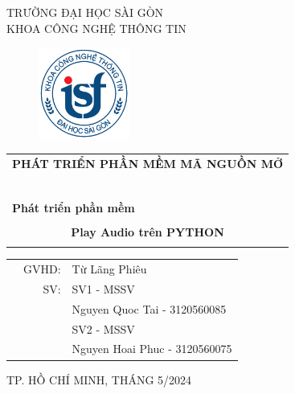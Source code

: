 \documentclass[a4paper]{article}
\begin{document}
\begin{titlepage}
\begin{center}
TRƯỜNG ĐẠI HỌC SÀI GÒN \\
KHOA CÔNG NGHỆ THÔNG TIN
\end{center}
\vspace{1cm}

\begin{figure}[h!]
\begin{center}
\includegraphics[width=3cm]{logoITSGU.png}
\end{center}
\end{figure}

\vspace{1cm}

\begin{center}
\begin{tabular}{c}
    \multicolumn{1}{l}{\textbf{{\Large PHÁT TRIỂN PHẦN MỀM MÃ NGUỒN MỞ}}}\\
    ~~\\
    \hline
    \\
    \multicolumn{1}{l}{\textbf{{\Large Phát triển phần mềm }}}\\
    \\
    \textbf{{\Huge Play Audio trên PYTHON}}\\
    \\
    \hline
\end{tabular}
\end{center}

\vspace{3cm}

\begin{table}[h]
\begin{tabular}{rrl}
\hspace{5 cm} & GVHD: & Từ Lãng Phiêu\\
& SV: & SV1 - MSSV\\
& & Nguyen Quoc Tai - 3120560085 \\
& & SV2 - MSSV \\
& & Nguyen Hoai Phuc - 3120560075 \\
\end{tabular}
\vspace{1.5 cm}
\end{table}

\begin{center}
{\footnotesize TP. HỒ CHÍ MINH, THÁNG 5/2024}
\end{center}
\end{titlepage}
\end{document}
